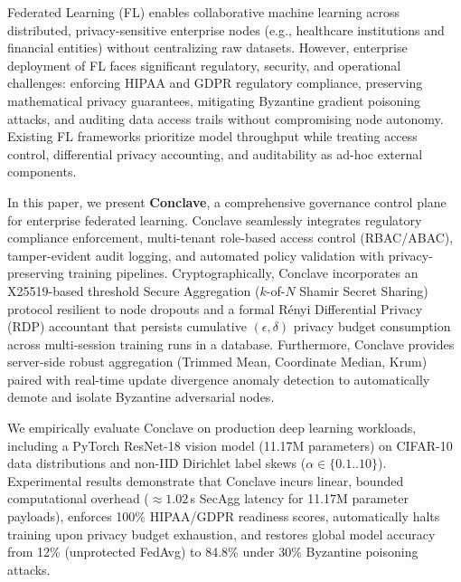 Federated Learning (FL) enables collaborative machine learning across distributed, privacy-sensitive enterprise nodes (e.g., healthcare institutions and financial entities) without centralizing raw datasets. However, enterprise deployment of FL faces significant regulatory, security, and operational challenges: enforcing HIPAA and GDPR regulatory compliance, preserving mathematical privacy guarantees, mitigating Byzantine gradient poisoning attacks, and auditing data access trails without compromising node autonomy. Existing FL frameworks prioritize model throughput while treating access control, differential privacy accounting, and auditability as ad-hoc external components.

In this paper, we present \textbf{Conclave}, a comprehensive governance control plane for enterprise federated learning. Conclave seamlessly integrates regulatory compliance enforcement, multi-tenant role-based access control (RBAC/ABAC), tamper-evident audit logging, and automated policy validation with privacy-preserving training pipelines. Cryptographically, Conclave incorporates an X25519-based threshold Secure Aggregation ($k$-of-$N$ Shamir Secret Sharing) protocol resilient to node dropouts and a formal Rényi Differential Privacy (RDP) accountant that persists cumulative $(\epsilon, \delta)$ privacy budget consumption across multi-session training runs in a database. Furthermore, Conclave provides server-side robust aggregation (Trimmed Mean, Coordinate Median, Krum) paired with real-time update divergence anomaly detection to automatically demote and isolate Byzantine adversarial nodes.

We empirically evaluate Conclave on production deep learning workloads, including a PyTorch ResNet-18 vision model (11.17M parameters) on CIFAR-10 data distributions and non-IID Dirichlet label skews ($\alpha \in \{0.1..10\}$). Experimental results demonstrate that Conclave incurs linear, bounded computational overhead ($\approx 1.02$\,s SecAgg latency for 11.17M parameter payloads), enforces 100\% HIPAA/GDPR readiness scores, automatically halts training upon privacy budget exhaustion, and restores global model accuracy from 12\% (unprotected FedAvg) to 84.8\% under 30\% Byzantine poisoning attacks.
